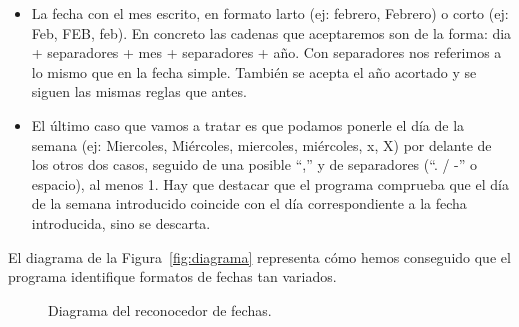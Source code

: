 \documentclass[12pt]{article}
\begin{document}
\begin{description}
\begin{itemize}
                \item La fecha con el mes escrito, en formato larto (ej: febrero, Febrero) o corto (ej: Feb, FEB, feb). En concreto las cadenas que aceptaremos son de la forma: dia + separadores + mes + separadores + año. Con separadores nos referimos a lo mismo que en la fecha simple. También se acepta el año acortado y se siguen las mismas reglas que antes.
                \item El último caso que vamos a tratar es que podamos ponerle el día de la semana (ej: Miercoles, Miércoles, miercoles, miércoles, x, X) por delante de los otros dos casos, seguido de una posible ``,'' y de separadores (``. / -'' o espacio), al menos 1. Hay que destacar que el programa comprueba que el día de la semana introducido coincide con el día correspondiente a la fecha introducida, sino se descarta. 
            \end{itemize}
            El diagrama de la Figura~\ref{fig:diagrama} representa cómo hemos conseguido que el programa identifique formatos de fechas tan variados.
            \begin{figure}[H]
                \centering
                \caption{Diagrama del reconocedor de fechas.}

\end{figure}
\end{description}
\end{document}

